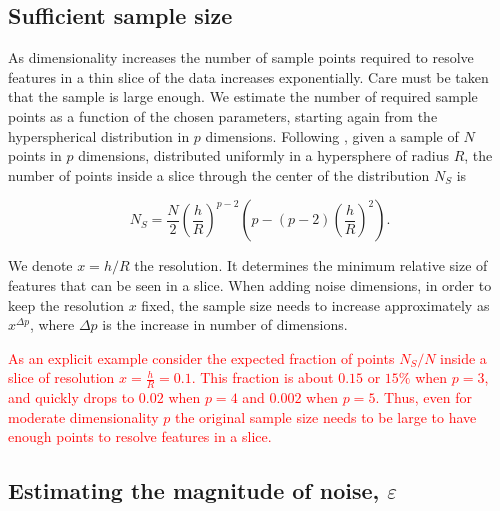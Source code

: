 \documentclass[]{interact}
\theoremstyle{plain}%
\theoremstyle{definition}
\theoremstyle{remark}
\begin{document}
\hypertarget{sufficient-sample-size}{%
\subsection{Sufficient sample size}\label{sufficient-sample-size}}

As dimensionality increases the number of sample points required to
resolve features in a thin slice of the data increases exponentially.
Care must be taken that the sample is large enough. We estimate the
number of required sample points as a function of the chosen parameters,
starting again from the hyperspherical distribution in \(p\) dimensions.
Following \citet{laa2019slice}, given a sample of \(N\) points in \(p\)
dimensions, distributed uniformly in a hypersphere of radius \(R\), the
number of points inside a slice through the center of the distribution
\(N_S\) is

\begin{equation}
N_S = \frac{N}{2} \left(\frac{h}{R}\right)^{p-2} \left(p - (p-2)\left(\frac{h}{R}\right)^{2}\right).
\label{eq:count}
\end{equation}

\noindent We denote \(x=h/R\) the resolution. It determines the minimum
relative size of features that can be seen in a slice. When adding noise
dimensions, in order to keep the resolution \(x\) fixed, the sample size
needs to increase approximately as \(x^{\Delta p}\), where \(\Delta p\)
is the increase in number of dimensions.

\textcolor{red}{As an explicit example consider the expected fraction of points $N_S/N$ inside a slice of resolution $x=\frac{h}{R}=0.1$. This fraction is about $0.15$ or $15\%$ when $p=3$, and quickly drops to $0.02$ when $p=4$ and $0.002$ when $p=5$. Thus, even for moderate dimensionality $p$ the original sample size needs to be large to have enough points to resolve features in a slice.}

\hypertarget{estimating-the-magnitude-of-noise-varepsilon}{%
\subsection{\texorpdfstring{Estimating the magnitude of noise,
\(\varepsilon\)
\label{sec:epsilon}}{Estimating the magnitude of noise, \textbackslash varepsilon }}\label{estimating-the-magnitude-of-noise-varepsilon}}
\end{document}
